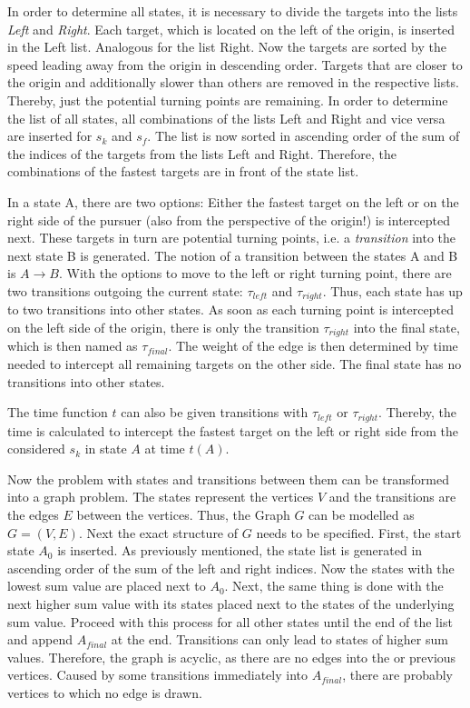 \documentclass[english,version-2019-07]{uzl-thesis}
\begin{document}
In order to determine all states, it is necessary to divide the targets into the lists \emph{Left} and \emph{Right}. Each target, which is located on the left of the origin, is inserted in the Left list. Analogous for the list Right. Now the targets are sorted by the speed leading away from the origin in descending order. Targets that are closer to the origin and additionally slower than others are removed in the respective lists. Thereby, just the potential turning points are remaining. In order to determine the list of all states, all combinations of the lists Left and Right and vice versa are inserted for $s_k$ and $s_f$. The list is now sorted in ascending order of the sum of the indices of the targets from the lists Left and Right. Therefore, the combinations of the fastest targets are in front of the state list. 

In a state A, there are two options: Either the fastest target on the left or on the right side of the pursuer (also from the perspective of the origin!) is intercepted next. These targets in turn are potential turning points, i.e. a \emph{transition} into the next state B is generated. The notion of a transition between the states A and B is $A\rightarrow B$. With the options to move to the left or right turning point, there are two transitions outgoing the current state: $\tau_{left}$ and $\tau_{right}$. Thus, each state has up to two transitions into other states. As soon as each turning point is intercepted on the left side of the origin, there is only the transition $\tau_{right}$ into the final state, which is then named as $\tau_{final}$. The weight of the edge is then determined by time needed to intercept all remaining targets on the other side. The final state has no transitions into other states.  

The time function $t$ can also be given transitions with $\tau_{left}$ or $\tau_{right}$. Thereby, the time is calculated to intercept the fastest target on the left or right side from the considered $s_k$ in state $A$ at time $t(A)$.

Now the problem with states and transitions between them can be transformed into a graph problem. The states represent the vertices $V$ and the transitions are the edges $E$ between the vertices. Thus, the Graph $G$ can be modelled as $G=(V,E)$. Next the exact structure of $G$ needs to be specified. First, the start state $A_0$ is inserted. As previously mentioned, the state list is generated in ascending order of the sum of the left and right indices. Now the states with the lowest sum value are placed next to $A_0$. Next, the same thing is done with the next higher sum value with its states placed next to the states of the underlying sum value. Proceed with this process for all other states until the end of the list and append $A_{final}$ at the end. Transitions can only lead to states of higher sum values. Therefore, the graph is acyclic, as there are no edges into the or previous vertices. Caused by some transitions immediately into $A_{final}$, there are probably vertices to which no edge is drawn.
\end{document}

